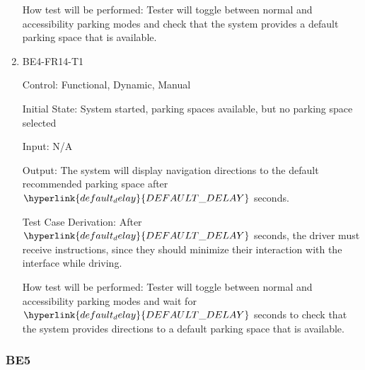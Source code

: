 \documentclass[12pt, titlepage]{article}
\begin{document}
\begin{enumerate}
How test will be performed: Tester will toggle between normal and accessibility
parking modes and check that the system provides a default parking space that is
available.

\item{BE4-FR14-T1}

Control: Functional, Dynamic, Manual
					
Initial State: System started, parking spaces available, but no parking space
selected
					
Input: N/A
					
Output: The system will display navigation directions to the default recommended
parking space after $\hyperlink{default_delay}{DEFAULT\_DELAY}$ seconds.

Test Case Derivation: After $\hyperlink{default_delay}{DEFAULT\_DELAY}$ seconds,
the driver must receive instructions, since they should minimize their
interaction with the interface while driving.
					
How test will be performed: Tester will toggle between normal and accessibility
parking modes and wait for $\hyperlink{default_delay}{DEFAULT\_DELAY}$ seconds
to check that the system provides directions to a default parking space that is
available.

\end{enumerate}

\subsubsection{BE5}
\end{document}
